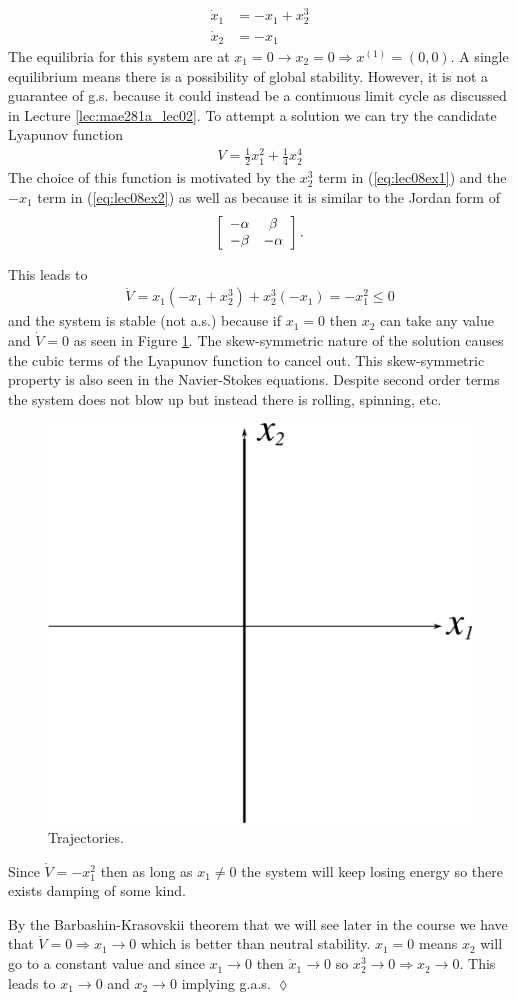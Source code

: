 \begin{example}
\begin{align}
\label{eq:lec08ex1}
\dot{x}_1 &= -x_1+x_2^3 \\
\label{eq:lec08ex2}
\dot{x}_2 &= -x_1
\end{align}
The equilibria for this system are at $x_1=0\rightarrow x_2=0 \Rightarrow x^{(1)}=(0,0)$. A single equilibrium means there is a possibility of global stability. However, it is not a guarantee of g.s. because it could instead be a continuous limit cycle as discussed in Lecture \ref{lec:mae281a_lec02}. To attempt a solution we can try the candidate Lyapunov function
\begin{align*}
V=\tfrac{1}{2}x_1^2 + \tfrac{1}{4}x_2^4
\end{align*}
The choice of this function is motivated by the $x_2^3$ term in (\ref{eq:lec08ex1}) and the $-x_1$ term in (\ref{eq:lec08ex2}) as well as because it is similar to the Jordan form of
\begin{align*}
\left[\begin{array}{c c}
-\alpha & \beta \\ -\beta & -\alpha
\end{array}\right].
\end{align*}

This leads to
\begin{align*}
\dot{V} = x_1(-x_1+x_2^3)+ x_2^3(-x_1) = -x_1^2 \leq 0
\end{align*}
and the system is stable (not a.s.) because if $x_1=0$ then $x_2$ can take any value and $\dot{V}=0$ as seen in Figure \ref{fig:08verticalEq}. The skew-symmetric nature of the solution causes the cubic terms of the Lyapunov function to cancel out. This skew-symmetric property is also seen in the Navier-Stokes equations. Despite second order terms the system does not blow up but instead there is rolling, spinning, etc.

\begin{figure}[ht!]
	\centering
	\includegraphics[width=.4\textwidth]{images/08verticalEq}
	\caption{Trajectories.}
	\label{fig:08verticalEq}
\end{figure}

Since $\dot{V}=-x_1^2$ then as long as $x_1\neq0$ the system will keep losing energy so there exists damping of some kind.

By the Barbashin-Krasovskii theorem that we will see later in the course we have that $\dot{V}=0\Rightarrow x_1\to0$ which is better than neutral stability. $x_1=0$ means $x_2$ will go to a constant value and since $x_1\to0$ then $\dot{x}_1\to0$ so $x_2^3\to0\Rightarrow x_2\to0$. This leads to $x_1\to0$ and $x_2\to0$ implying g.a.s.
$\lozenge$
\end{example}

